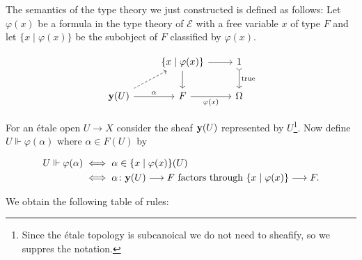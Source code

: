 \begin{construction}
	The semantics of the type theory we just constructed is defined as follows: Let $\varphi(x)$ be a formula in the type theory of $\mathcal{E}$ with a free variable $x$ of type $F$ and let $\{x \mid \varphi(x)\}$ be the subobject of $F$ classified by $\varphi(x)$.

	\[\begin{tikzcd}
			& {\{x  \mid \varphi(x)\}} & 1 \\
			\yo(U) & F & \Omega
			\arrow[from=1-2, to=1-3]
			\arrow[from=1-2, to=2-2]
			\arrow["{\varphi(x)}"', from=2-2, to=2-3]
			\arrow["\text{true}", tail, from=1-3, to=2-3]
			\arrow[dashed, from=2-1, to=1-2]
			\arrow["\alpha", from=2-1, to=2-2]
		\end{tikzcd}\]

	For an \'etale open $U \to X$ consider the sheaf $\mathbf{y}(U)$ represented by $U$\footnote{Since the \'etale topology is subcanoical we do not need to sheafify, so we suppres the notation.}. Now define $U \Vdash \varphi(\alpha)$ where $\alpha \in F(U)$ by

	\begin{align*}
		U \Vdash \varphi(\alpha) & \iff \alpha \in \{x \mid \varphi(x)\}(U)                                              \\
		                         & \iff \alpha \colon \mathbf{y}(U) \longrightarrow F \text{ factors through } \{x \mid \varphi(x)\} \longrightarrow F.
	\end{align*}

	We obtain the following table of rules:

	\begin{center}
		\def\arraystretch{1.5}%


\end{center}
\end{construction}
